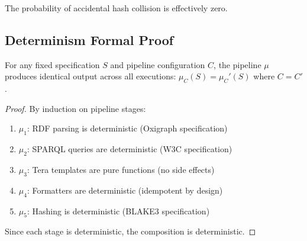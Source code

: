 The probability of accidental hash collision is effectively zero.

\subsection{Determinism Formal Proof}

\begin{theorem}
    For any fixed specification \(S\) and pipeline configuration \(C\), the pipeline \(\mu\) produces identical output across all executions: \(\mu_C(S) = \mu_C'(S)\) where \(C = C'\).
\end{theorem}

\begin{proof}
    By induction on pipeline stages:
    \begin{enumerate}
        \item \(\mu_1\): RDF parsing is deterministic (Oxigraph specification)
        \item \(\mu_2\): SPARQL queries are deterministic (W3C specification)
        \item \(\mu_3\): Tera templates are pure functions (no side effects)
        \item \(\mu_4\): Formatters are deterministic (idempotent by design)
        \item \(\mu_5\): Hashing is deterministic (BLAKE3 specification)
    \end{enumerate}
    Since each stage is deterministic, the composition is deterministic.
\end{proof}
